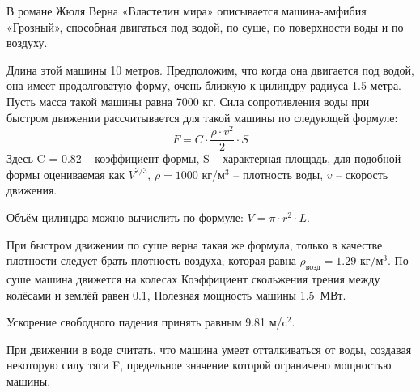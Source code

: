 

В романе Жюля Верна «Властелин мира» описывается машина-амфибия «Грозный», способная двигаться под водой, 
по суше, по поверхности воды и по воздуху. 

Длина этой машины 10 метров. Предположим, что когда она двигается под водой, она имеет продолговатую 
форму, очень близкую к цилиндру радиуса 1.5 метра. Пусть масса такой машины равна 7000 кг. 
Сила сопротивления воды при быстром движении рассчитывается для такой машины по следующей формуле:
$$F=C \cdot \frac{\rho  \cdot v^2}{2} \cdot S$$
Здесь C = 0.82 – коэффициент формы, S – характерная площадь, для подобной формы оцениваемая как $V^{2/3}$, 
$\rho  = 1000$ кг/м$^3$ – плотность воды, $v$ – скорость движения.

Объём цилиндра можно вычислить по формуле:  $V=\pi \cdot r^2 \cdot L$.

При быстром движении по суше верна такая же формула, только в качестве плотности следует брать 
плотность воздуха, которая равна  $\rho_\text{возд} = 1.29$ кг/м$^3$. По суше машина движется на колесах Коэффициент скольжения трения между колёсами и землёй равен 0.1, 
Полезная мощность машины 1.5~МВт.

Ускорение свободного падения принять равным 9.81 м/c$^2$.

При движении в воде считать, что машина умеет отталкиваться от воды, создавая некоторую силу тяги F, предельное 
значение которой ограничено мощностью машины.

